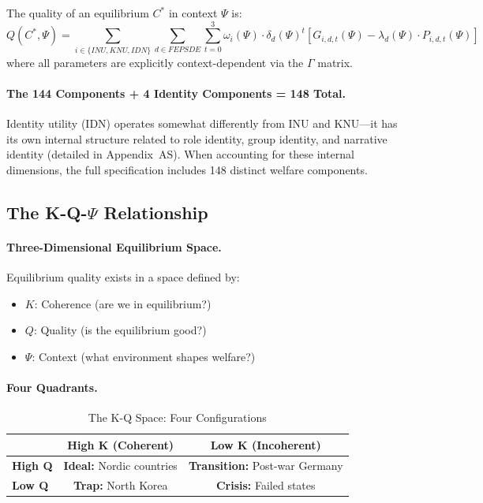 \begin{definition}
The quality of an equilibrium $C^*$ in context $\Psi$ is:
\begin{equation}
\boxed{
  Q(C^*, \Psi) = \sum_{i \in \{INU, KNU, IDN\}} \sum_{d \in FEPSDE} \sum_{t=0}^{3} 
           \omega_i(\Psi) \cdot \delta_d(\Psi)^t \left[ G_{i,d,t}(\Psi) - \lambda_d(\Psi) \cdot P_{i,d,t}(\Psi) \right]
}
  \label{eq:eqquality-context}
\end{equation}
where all parameters are explicitly context-dependent via the $\Gamma$ matrix.
\end{definition}

\paragraph{The 144 Components + 4 Identity Components = 148 Total.}
Identity utility (IDN) operates somewhat differently from INU and KNU---it has its own 
internal structure related to role identity, group identity, and narrative identity 
(detailed in Appendix~AS). When accounting for these internal dimensions, the full 
specification includes 148 distinct welfare components.

\subsection{The K-Q-$\Psi$ Relationship}

\paragraph{Three-Dimensional Equilibrium Space.}
Equilibrium quality exists in a space defined by:
\begin{itemize}
  \item $K$: Coherence (are we in equilibrium?)
  \item $Q$: Quality (is the equilibrium good?)
  \item $\Psi$: Context (what environment shapes welfare?)
\end{itemize}

\paragraph{Four Quadrants.}
\begin{table}[htbp]
\centering
\caption{The K-Q Space: Four Configurations}
\label{tab:k-q-quadrants}
\renewcommand{\arraystretch}{1.3}
\begin{tabular}{@{}lcc@{}}
\toprule
& \textbf{High K} (Coherent) & \textbf{Low K} (Incoherent) \\
\midrule
\textbf{High Q} & \textbf{Ideal:} Nordic countries & \textbf{Transition:} Post-war Germany \\
\textbf{Low Q} & \textbf{Trap:} North Korea & \textbf{Crisis:} Failed states \\
\bottomrule
\end{tabular}
\end{table}

